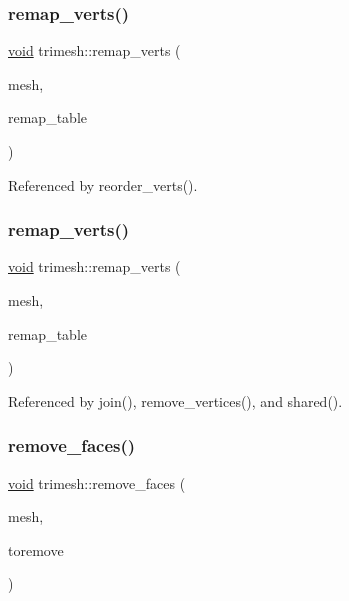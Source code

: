 \subsubsection{\texorpdfstring{remap\+\_\+verts()}{remap\_verts()}\hspace{0.1cm}{\footnotesize\ttfamily [1/2]}}
{\footnotesize\ttfamily \hyperlink{namespacetrimesh_a784ddfd979e1c579bda795a8edfc3f43}{void} trimesh\+::remap\+\_\+verts (\begin{DoxyParamCaption}\item[{\hyperlink{classtrimesh_1_1TriMesh}{Tri\+Mesh} $\ast$}]{mesh,  }\item[{const std\+::vector$<$ int $>$ \&}]{remap\+\_\+table }\end{DoxyParamCaption})}



Referenced by reorder\+\_\+verts().

\mbox{\label{namespacetrimesh_a21a4ec76f2dfeff182e6170eab0ce31b}} 
\subsubsection{\texorpdfstring{remap\+\_\+verts()}{remap\_verts()}\hspace{0.1cm}{\footnotesize\ttfamily [2/2]}}
{\footnotesize\ttfamily \hyperlink{namespacetrimesh_a784ddfd979e1c579bda795a8edfc3f43}{void} trimesh\+::remap\+\_\+verts (\begin{DoxyParamCaption}\item[{\hyperlink{classtrimesh_1_1TriMesh}{Tri\+Mesh} $\ast$}]{mesh,  }\item[{const \+::std\+::vector$<$ int $>$ \&}]{remap\+\_\+table }\end{DoxyParamCaption})}



Referenced by join(), remove\+\_\+vertices(), and shared().

\mbox{\label{namespacetrimesh_a8aa31b33984576eec08cbddfd59456f4}} 
\subsubsection{\texorpdfstring{remove\+\_\+faces()}{remove\_faces()}\hspace{0.1cm}{\footnotesize\ttfamily [1/2]}}
{\footnotesize\ttfamily \hyperlink{namespacetrimesh_a784ddfd979e1c579bda795a8edfc3f43}{void} trimesh\+::remove\+\_\+faces (\begin{DoxyParamCaption}\item[{\hyperlink{classtrimesh_1_1TriMesh}{Tri\+Mesh} $\ast$}]{mesh,  }\item[{const \+::std\+::vector$<$ bool $>$ \&}]{toremove }\end{DoxyParamCaption})}



